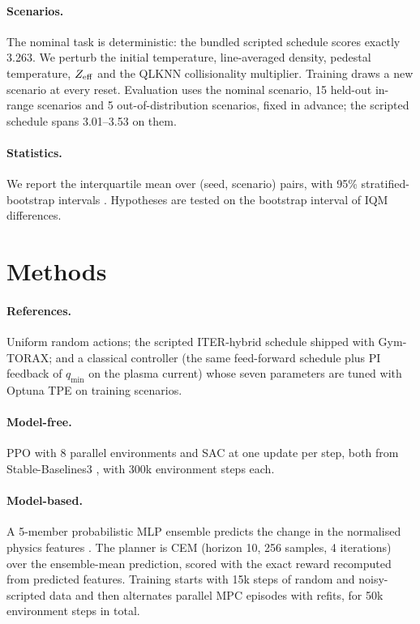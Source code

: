 \documentclass[11pt]{article}
\begin{document}
\paragraph{Scenarios.} The nominal task is deterministic: the bundled scripted schedule scores exactly 3.263.
We perturb the initial temperature, line-averaged density, pedestal temperature, $Z_{\rm eff}$ and the QLKNN
collisionality multiplier. Training draws a new scenario at every reset. Evaluation uses the nominal scenario,
15 held-out in-range scenarios and 5 out-of-distribution scenarios, fixed in advance; the scripted schedule spans
3.01--3.53 on them.
\paragraph{Statistics.} We report the interquartile mean over (seed, scenario) pairs, with 95\% stratified-bootstrap
intervals \citep{agarwal2021precipice}. Hypotheses are tested on the bootstrap interval of IQM differences.

\section{Methods}
\paragraph{References.} Uniform random actions; the scripted ITER-hybrid schedule shipped with Gym-TORAX; and a
classical controller (the same feed-forward schedule plus PI feedback of $q_{\min}$ on the plasma current) whose
seven parameters are tuned with Optuna TPE \citep{akiba2019optuna} on training scenarios.
\paragraph{Model-free.} PPO \citep{schulman2017ppo} with 8 parallel environments and SAC \citep{haarnoja2018sac}
at one update per step, both from Stable-Baselines3 \citep{raffin2021sb3}, with 300k environment steps each.
\paragraph{Model-based.} A 5-member probabilistic MLP ensemble predicts the change in the normalised physics features
\citep{chua2018pets}. The planner is CEM (horizon 10, 256 samples, 4 iterations) over the ensemble-mean prediction,
scored with the exact reward recomputed from predicted features. Training starts with 15k steps of random and
noisy-scripted data and then alternates parallel MPC episodes with refits, for 50k environment steps in total.
\end{document}
